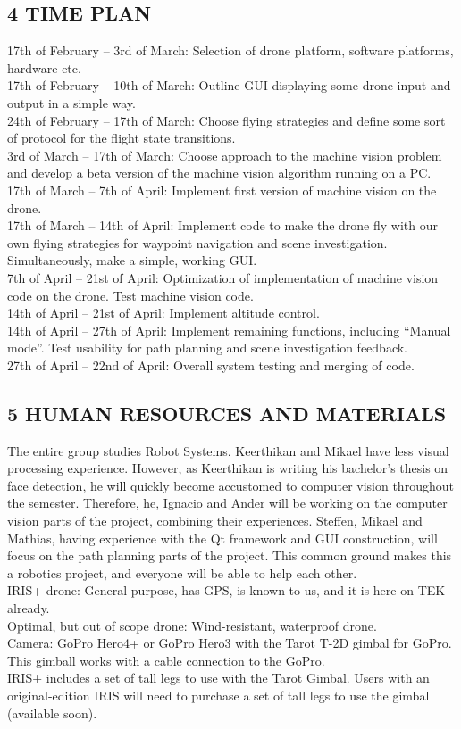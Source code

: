 \subsection*{4 TIME PLAN}
17th of February – 3rd of March: Selection of drone platform, software platforms, hardware etc.\\
17th of February – 10th of March: Outline GUI displaying some drone input and output in a simple way.\\
24th of February – 17th of March: Choose flying strategies and define some sort of protocol for the flight state transitions.\\
3rd of March – 17th of March: Choose approach to the machine vision problem and develop a beta version of the machine vision algorithm running on a PC.\\
17th of March – 7th of April: Implement first version of machine vision on the drone.\\
17th of March – 14th of April: Implement code to make the drone fly with our own flying strategies for waypoint navigation and scene investigation. Simultaneously, make a simple, working GUI.\\
7th of April – 21st of April: Optimization of implementation of machine vision code on the drone. Test machine vision code.\\
14th of April – 21st of April: Implement altitude control.\\
14th of April – 27th of April: Implement remaining functions, including “Manual mode”. Test usability for path planning and scene investigation feedback.\\
27th of April – 22nd of April: Overall system testing and merging of code.\\
\subsection*{5 HUMAN RESOURCES AND MATERIALS}
The entire group studies Robot Systems. Keerthikan and Mikael have less visual processing experience. 
However, as Keerthikan is writing his bachelor’s thesis on face detection, he will quickly become accustomed to computer vision throughout the semester. 
Therefore, he, Ignacio and Ander will be working on the computer vision
 parts of the project, combining their experiences.
Steffen, Mikael and Mathias, having experience with the Qt framework 
and GUI construction, will focus on the path planning parts of the project.
This common ground makes this a robotics project, 
and everyone will be able to help each other.\\
IRIS+ drone: General purpose, has GPS, is known to us,
 and it is here on TEK already.\\
Optimal, but out of scope drone: Wind-resistant, waterproof drone.\\
Camera: GoPro Hero4+ or GoPro Hero3 with the Tarot T-2D gimbal
 for GoPro. This gimball works with a cable connection to the GoPro.\\ 
IRIS+ includes a set of tall legs to use with the Tarot Gimbal. 
Users with an original-edition IRIS will need to purchase a set of tall legs to use the gimbal (available soon).